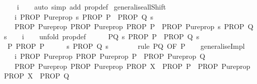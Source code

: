\begin{isabellebody}
%
\isadelimproof
\ \ %
\endisadelimproof
%
\isatagproof
{}\isamarkupfalse%
\ i\isanewline
\ \ \isamarkupfalse%
\ {\isacharparenleft}auto\ simp\ add{\isacharcolon}\ prop{\isacharunderscore}def{\isacharparenright}%
\endisatagproof
{\isafoldproof}%
%
\isadelimproof
\isanewline
%
\endisadelimproof
\isanewline
{}\isamarkupfalse%
\ generalise{\isacharunderscore}allShift{\isacharcolon}\isanewline
\ \ \ i{\isacharcolon}\ {\isachardoublequoteopen}PROP\ Pure{\isachardot}prop\ {\isacharparenleft}{\isasymAnd}s{\isachardot}\ PROP\ P\ {\isasymLongrightarrow}\ PROP\ Q\ s{\isacharparenright}{\isachardoublequoteclose}\isanewline
\ \ \ {\isachardoublequoteopen}PROP\ Pure{\isachardot}prop\ {\isacharparenleft}PROP\ Pure{\isachardot}prop\ {\isacharparenleft}PROP\ P{\isacharparenright}\ {\isasymLongrightarrow}\ PROP\ Pure{\isachardot}prop\ {\isacharparenleft}{\isasymAnd}s{\isachardot}\ PROP\ Q\ s{\isacharparenright}{\isacharparenright}{\isachardoublequoteclose}\isanewline
%
\isadelimproof
\ \ %
\endisadelimproof
%
\isatagproof
{}\isamarkupfalse%
\ i\isanewline
\ \ \isamarkupfalse%
\ {\isacharparenleft}unfold\ prop{\isacharunderscore}def{\isacharparenright}\isanewline
\ \ \ \ \isamarkupfalse%
\ P{\isacharunderscore}Q{\isacharcolon}\ {\isachardoublequoteopen}{\isasymAnd}s{\isachardot}\ PROP\ P\ {\isasymLongrightarrow}\ PROP\ Q\ s{\isachardoublequoteclose}\ \isanewline
\ \ \ \ \isamarkupfalse%
\ P{\isacharcolon}\ {\isachardoublequoteopen}PROP\ P{\isachardoublequoteclose}\isanewline
\ \ \ \ \isamarkupfalse%
\ {\isachardoublequoteopen}{\isasymAnd}s{\isachardot}\ PROP\ Q\ s{\isachardoublequoteclose}\isanewline
\ \ \ \ \ \ \isamarkupfalse%
\ {\isacharparenleft}rule\ P{\isacharunderscore}Q\ {\isacharbrackleft}OF\ P{\isacharbrackright}{\isacharparenright}\isanewline
\ \ \isamarkupfalse%
%
\endisatagproof
{\isafoldproof}%
%
\isadelimproof
\isanewline
%
\endisadelimproof
\isanewline
\isanewline
{}\isamarkupfalse%
\ generaliseImpl{\isacharcolon}\isanewline
\ \ \ i{\isacharcolon}\ {\isachardoublequoteopen}PROP\ Pure{\isachardot}prop\ {\isacharparenleft}PROP\ Pure{\isachardot}prop\ P\ {\isasymLongrightarrow}\ PROP\ Pure{\isachardot}prop\ Q{\isacharparenright}{\isachardoublequoteclose}\isanewline
\ \ \ {\isachardoublequoteopen}PROP\ Pure{\isachardot}prop\ {\isacharparenleft}{\isacharparenleft}PROP\ Pure{\isachardot}prop\ {\isacharparenleft}PROP\ X\ {\isasymLongrightarrow}\ PROP\ P{\isacharparenright}{\isacharparenright}\ {\isasymLongrightarrow}\ {\isacharparenleft}PROP\ Pure{\isachardot}prop\ {\isacharparenleft}PROP\ X\ {\isasymLongrightarrow}\ PROP\ Q{\isacharparenright}{\isacharparenright}{\isacharparenright}{\isachardoublequoteclose}\isanewline

\end{isabellebody}

